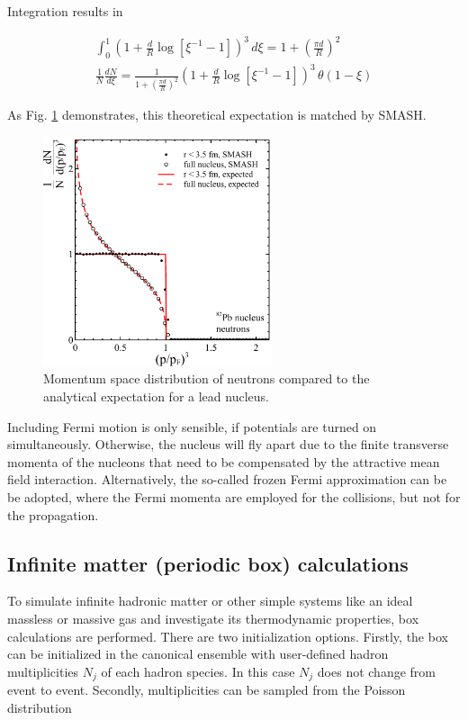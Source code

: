 Integration results in

\begin{align}
  \int_0^1 \left(1 +\frac{d}{R} \log[\xi^{-1} - 1] \right)^3 \, d\xi = 1 + \left( \frac{\pi d}{R} \right)^2 \\
  \frac{1}{N} \frac{dN}{d\xi} = \frac{1}{1 + \left( \frac{\pi d}{R} \right)^2} \left(1 +\frac{d}{R} \log[\xi^{-1} - 1] \right)^3 \, \theta(1 - \xi)
\end{align}


As Fig. \ref{fig:fermi} demonstrates, this theoretical expectation is matched by SMASH.

\begin{figure}
  \centering
  \includegraphics[width=0.6\textwidth]{plots/smash/Fermi_momenta_Pb.pdf}
  \caption{Momentum space distribution of neutrons compared to the analytical expectation for a lead nucleus. }
  \label{fig:fermi}
\end{figure}

Including Fermi motion is only sensible, if potentials are turned on
simultaneously. Otherwise, the nucleus will fly apart due to the finite
transverse momenta of the nucleons that need to be compensated by the
attractive mean field interaction. Alternatively, the so-called frozen Fermi
approximation can be be adopted, where the Fermi momenta are employed for the
collisions, but not for the propagation.

\subsection{Infinite matter (periodic box) calculations}

To simulate infinite hadronic matter or other simple systems like an ideal
massless or massive gas and investigate its thermodynamic properties, box
calculations are performed. There are two initialization options. Firstly, the
box can be initialized in the canonical ensemble with user-defined hadron
multiplicities $N_j$ of each hadron species. In this case $N_j$ does not change
from event to event. Secondly, multiplicities can be sampled from the Poisson
distribution

